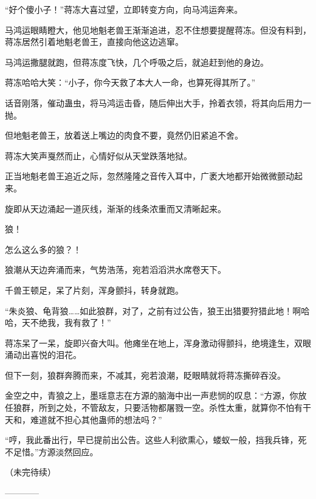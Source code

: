 \begin{this_body}
“好个傻小子！”蒋冻大喜过望，立即转变方向，向马鸿运奔来。

马鸿运眼睛瞪大，他见地魁老兽王渐渐追进，忍不住想要提醒蒋冻。但没有料到，蒋冻居然引着地魁老兽王，直接向他这边逃窜。

马鸿运撒腿就跑，但蒋冻度飞快，几个呼吸之后，就追赶到他的身边。

蒋冻哈哈大笑：“小子，你今天救了本大人一命，也算死得其所了。”

话音刚落，催动蛊虫，将马鸿运击昏，随后伸出大手，拎着衣领，将其向后用力一抛。

但地魁老兽王，放着送上嘴边的肉食不要，竟然仍旧紧追不舍。

蒋冻大笑声戛然而止，心情好似从天堂跌落地狱。

正当地魁老兽王追近之际，忽然隆隆之音传入耳中，广袤大地都开始微微颤动起来。

旋即从天边涌起一道灰线，渐渐的线条浓重而又清晰起来。

狼！

怎么这么多的狼？！

狼潮从天边奔涌而来，气势浩荡，宛若滔滔洪水席卷天下。

千兽王顿足，呆了片刻，浑身颤抖，转身就跑。

“朱炎狼、龟背狼……如此狼群，对了，之前有过公告，狼王出猎要狩猎此地！啊哈哈，天不绝我，我有救了！”

蒋冻呆了一呆，旋即兴奋大叫。他瘫坐在地上，浑身激动得颤抖，绝境逢生，双眼涌动出喜悦的泪花。

但下一刻，狼群奔腾而来，不减其，宛若浪潮，眨眼睛就将蒋冻撕碎吞没。

金空之中，青狼之上，墨瑶意志在方源的脑海中出一声悲悯的叹息：“方源，你放任狼群，所到之处，不管敌友，只要活物都屠戮一空。杀性太重，就算你不怕有干天和，难道就不担心其他蛊师的想法吗？”

“哼，我此番出行，早已提前出公告。这些人利欲熏心，蝼蚁一般，挡我兵锋，死不足惜。”方源淡然回应。

（未完待续）

------------

\end{this_body}

